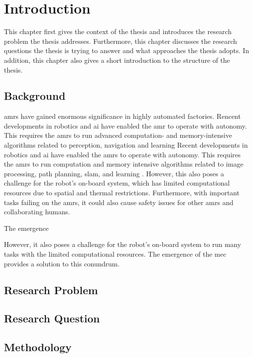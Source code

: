 \chapter{Introduction}

This chapter first gives the context of the thesis and introduces the research problem the thesis addresses. Furthermore, this chapter discusses the research questions the thesis is trying to answer and what approaches the thesis adopts. In addition, this chapter also gives a short introduction to the structure of the thesis.

\section{Background}

\glspl{amr} have gained enormous significance in highly automated factories. Rencent developments in robotics and \gls{ai} have enabled the \gls{amr} to operate with autonomy. This requires the \glspl{amr} to run advanced computation- and memory-intensive algorithms related to perception, navigation and learning \cite{Saeik2021, B}
Recent developments in robotics and \gls{ai} have enabled the \glspl{amr} to operate with autonomy. This requires the \glspl{amr} to run computation and memory intensive algorithms related to image processing, path planning, \gls{slam}, and learning \cite{Saeik2021}. However, this also poses a challenge for the robot's on-board system, which has limited computational resources due to spatial and thermal restrictions. Furthermore, with important tasks failing on the \glspl{amr}, it could also cause safety issues for other \glspl{amr} and collaborating humans.

The emergence 

However, it also poses a challenge for the robot's on-board system to run many tasks with the limited computational resources. The emergence of the \gls{mec} provides a solution to this conundrum. 

\section{Research Problem}

\section{Research Question}

\section{Methodology}